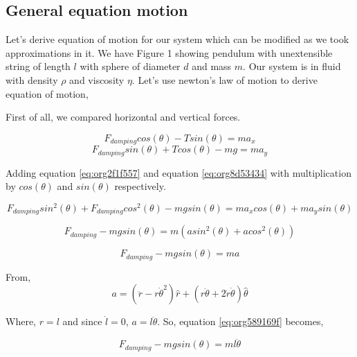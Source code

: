 \documentclass[11pt,a4paper]{article}
\begin{document}
\subsection{General equation motion}
\label{sec:org05093b1}

Let's derive equation of motion for our system which can be modified as we took approximations in it. We have Figure 1 showing pendulum with unextensible string of length \(l\) with sphere of diameter \(d\) and mass \(m\). Our system is in fluid with density \(\rho\) and viscosity \(\eta\). Let's use newton's law of motion to derive equation of motion,

First of all, we compared horizontal and vertical forces.

\begin{equation}
\label{eq:org2f1f557}
   F_{damping}cos(\theta)-Tsin(\theta)=ma_{x}
\end{equation}
\begin{equation}
\label{eq:org8d53434}
   F_{damping}sin(\theta)+Tcos(\theta)-mg=ma_{y}
\end{equation}

Adding equation \ref{eq:org2f1f557} and equation \ref{eq:org8d53434} with multiplication by \(cos(\theta)\) and \(sin(\theta)\) respectively.

\begin{equation*}
\label{eq:org9d86642}
F_{damping}sin^{2}(\theta)+F_{damping}cos^{2}(\theta)-mgsin(\theta)=ma_{x}cos(\theta)+ma_{y}sin(\theta)
\end{equation*}

\begin{equation*}
\label{eq:org8a747d4}
F_{damping}-mgsin(\theta)=m(asin^{2}(\theta)+acos^{2}(\theta))
\end{equation*}

\begin{equation}
\label{eq:org589169f}
F_{damping}-mgsin(\theta)=ma
\end{equation}

From,
\begin{equation*}
\label{eq:org71717fe}
a = (\ddot{r}-r\dot{\theta}^{2})\hat{r} + (r \ddot{\theta}+2\dot{r}\dot{\theta})\hat{\theta}
\end{equation*}

Where,  \(r=l\) and since \(\dot{l}=0\), \(a=l\ddot{\theta}\). So, equation \ref{eq:org589169f} becomes,

\begin{equation}
\label{eq:org5654976}
F_{damping}-mgsin(\theta)=ml\ddot{\theta}
\end{equation}
\end{document}
